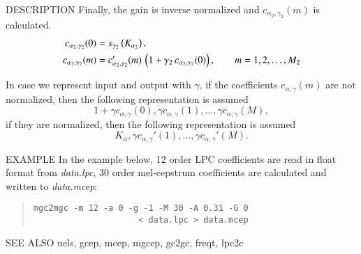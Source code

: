 \begin{qsection}{DESCRIPTION}
Finally, the gain is inverse normalized and $c_{\alpha_2,\gamma_2}(m)$
is calculated.
\begin{align}
c_{\alpha_2,\gamma_2}(0) &= 
	s_{\gamma_2}\left(K_{\alpha_2}\right), \notag \\
c_{\alpha_2,\gamma_2}(m) &= 
          c_{\alpha_2,\gamma_2}'(m)\,\left(1+\gamma_2\, 
          c_{\alpha_2,\gamma_2}(0)\right), 
          \qquad m = 1,2,\dots, M_2 \notag
\end{align}

In case we represent input and output with $\gamma$,
if the coefficients $c_{\alpha,\gamma}(m)$ are not normalized, then
the following representation is assumed
\begin{displaymath}
1+\gamma c_{\alpha,\gamma}(0), \gamma c_{\alpha,\gamma}(1), \dots, \gamma c_{\alpha,\gamma}(M),
\end{displaymath}
if they are normalized, then
the following representation is assumed
\begin{displaymath}
K_\alpha,\gamma c_{\alpha,\gamma}'(1),\dots, \gamma c_{\alpha,\gamma}'(M).
\end{displaymath}

\end{qsection}

\begin{options}
\end{options}

\begin{qsection}{EXAMPLE}
In the example below, 12 order LPC coefficients are read in
float format from {\em data.lpc}, 30 order mel-cepstrum
coefficients are calculated and written to {\em data.mcep}:
\begin{quote}
 \verb!mgc2mgc -m 12 -a 0 -g -1 -M 30 -A 0.31 -G 0!\\
 \verb!                     < data.lpc > data.mcep!
\end{quote} 
\end{qsection}

\begin{qsection}{SEE ALSO}
 uels, gcep, mcep, mgcep, gc2gc, freqt, lpc2c
\end{qsection}
